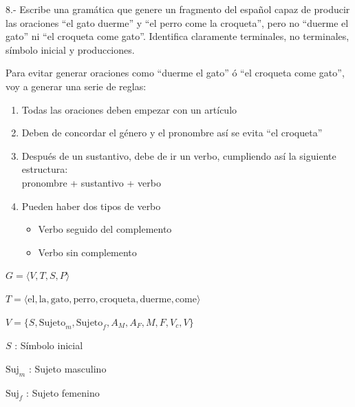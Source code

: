 8.- Escribe una gramática que genere un fragmento del español capaz de producir las oraciones ``el gato duerme'' y ``el perro come la croqueta'', pero no ``duerme el gato'' ni ``el croqueta come gato''. Identifica claramente terminales, no terminales, símbolo inicial y producciones.

\vspace{0.5cm}

\vspace{0.2cm}
\noindent Para evitar generar oraciones como ``duerme el gato'' ó ``el croqueta come gato'', voy a generar una serie de reglas:

\begin{enumerate}
    \item Todas las oraciones deben empezar con un artículo
    \item Deben de concordar el género  y el pronombre así se evita ``el croqueta''
    \item Después de un sustantivo, debe de ir un verbo, cumpliendo así la siguiente estructura: \\
    \hspace*{1cm} pronombre + sustantivo + verbo
    \item Pueden haber dos tipos de verbo
    \begin{itemize}
        \item Verbo seguido del complemento
        \item Verbo sin complemento
    \end{itemize}
\end{enumerate}

\vspace{0.5cm}

\noindent $G = \langle V, T, S, P \rangle$

\vspace{0.2cm}
\noindent $T = \langle \text{el}, \text{la}, \text{gato}, \text{perro}, \text{croqueta}, \text{duerme}, \text{come} \rangle$

\vspace{0.2cm}
\noindent $V = \{ S, \text{Sujeto}_m, \text{Sujeto}_f, A_M, A_F, M, F, V_c, V \}$

\vspace{0.4cm}
\noindent $S$ : Símbolo inicial

\vspace{0.2cm}
\noindent $\text{Suj}_m$ : Sujeto masculino

\vspace{0.2cm}
\noindent $\text{Suj}_f$ : Sujeto femenino

